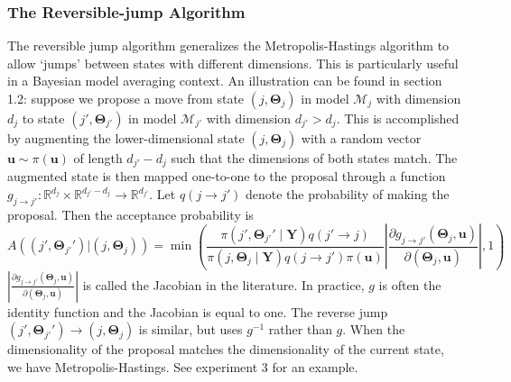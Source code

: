 \documentclass[a4paper,11pt]{article}
\begin{document}
\subsubsection{The Reversible-jump Algorithm}
The reversible jump algorithm \cite{green_reversible_1995} generalizes the Metropolis-Hastings algorithm to allow `jumps' between states with different dimensions. This is particularly useful in a Bayesian model averaging context. An illustration can be found in \cite{brooks_handbook_2011} section 1.2: suppose we propose a move from state $(j, \mathbf{\Theta}_{j})$ in model $\mathcal{M}_{j}$ with dimension $d_{j}$ to state $(j', \mathbf{\Theta}_{j'})$ in model $\mathcal{M}_{j'}$ with dimension $d_{j'}>d_{j}$. This is accomplished by augmenting the lower-dimensional state $(j, \mathbf{\Theta}_{j})$ with a random vector $\mathbf{u} \sim \pi(\mathbf{u})$ of length $d_{j'}-d_{j}$ such that the dimensions of both states match. The augmented state is then mapped one-to-one to the proposal through a function $g_{j \rightarrow j'}: \mathbb{R}^{d_{j}} \times \mathbb{R}^{d_{j'}-d_{j}} \rightarrow \mathbb{R}^{d_{j'}}$. Let $q(j \rightarrow j')$ denote the probability of making the proposal. Then the acceptance probability is
$$
A((j', \mathbf{\Theta}_{j'}')|(j, \mathbf{\Theta}_{j}))=\min \left( \frac{\pi(j', \mathbf{\Theta}_{j'}' \mid \mathbf{Y}) q(j' \rightarrow j)}{\pi(j, \mathbf{\Theta}_{j} \mid \mathbf{Y}) q(j \rightarrow j') \pi(\mathbf{u})}|\frac{\partial g_{j \rightarrow j'}(\mathbf{\Theta}_{j}, \mathbf{u})}{\partial(\mathbf{\Theta}_{j}, \mathbf{u})}|, 1\right)
$$
$|\frac{\partial g_{j \rightarrow j'}(\mathbf{\Theta}_{j}, \mathbf{u})}{\partial(\mathbf{\Theta}_{j}, \mathbf{u})}|$ is called the Jacobian in the literature. In practice, $g$ is often the identity function and the Jacobian is equal to one. The reverse jump $(j', \mathbf{\Theta}_{j'}') \rightarrow (j, \mathbf{\Theta}_{j})$ is similar, but uses $g^{-1}$ rather than $g$. When the dimensionality of the proposal matches the dimensionality of the current state, we have Metropolis-Hastings. See experiment 3 for an example.
\end{document}

